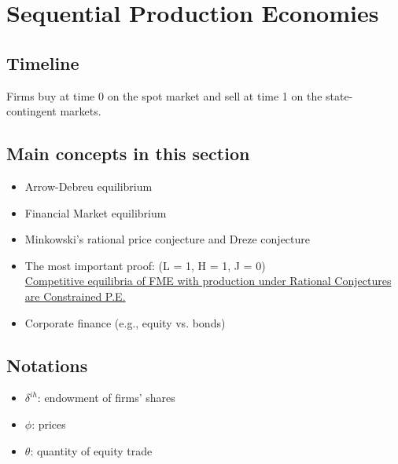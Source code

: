 \chapter{Sequential Production Economies}
\section*{Timeline}
Firms buy at time 0 on the spot market and sell at time 1 on the state-contingent markets.

\section{Main concepts in this section}
\begin{itemize}
    \item Arrow-Debreu equilibrium 
    \item Financial Market equilibrium 
    \item Minkowski's rational price conjecture and Dreze conjecture 
    \item The most important proof: (L = 1, H = 1, J = 0) \\
    \underline{Competitive equilibria of FME with production under Rational Conjectures are Constrained P.E.}
    \item Corporate finance (e.g., equity vs. bonds) 
\end{itemize}

\section*{Notations}
\begin{itemize}
    \item $\delta^{ih}$: endowment of firms' shares 
    \item $\phi$: prices 
    \item $\theta$: quantity of equity trade
\end{itemize}

\clearpage 
